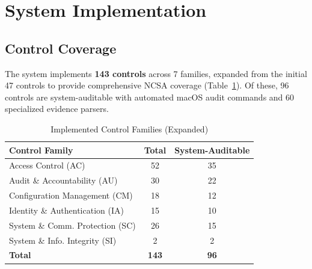 \documentclass[11pt,conference]{IEEEtran}
\begin{document}
\section{System Implementation}

\subsection{Control Coverage}

The system implements \textbf{143 controls} across 7 families, expanded from the initial 47 controls to provide comprehensive NCSA coverage (Table~\ref{tab:controls}). Of these, 96 controls are system-auditable with automated macOS audit commands and 60 specialized evidence parsers.

\begin{table}[!t]
\centering
\caption{Implemented Control Families (Expanded)}
\label{tab:controls}
\begin{tabular}{@{}lcc@{}}
\toprule
\textbf{Control Family} & \textbf{Total} & \textbf{System-Auditable} \\
\midrule
Access Control (AC) & 52 & 35 \\
Audit \& Accountability (AU) & 30 & 22 \\
Configuration Management (CM) & 18 & 12 \\
Identity \& Authentication (IA) & 15 & 10 \\
System \& Comm. Protection (SC) & 26 & 15 \\
System \& Info. Integrity (SI) & 2 & 2 \\
\midrule
\textbf{Total} & \textbf{143} & \textbf{96} \\
\bottomrule
\end{tabular}
\end{table}
\end{document}
